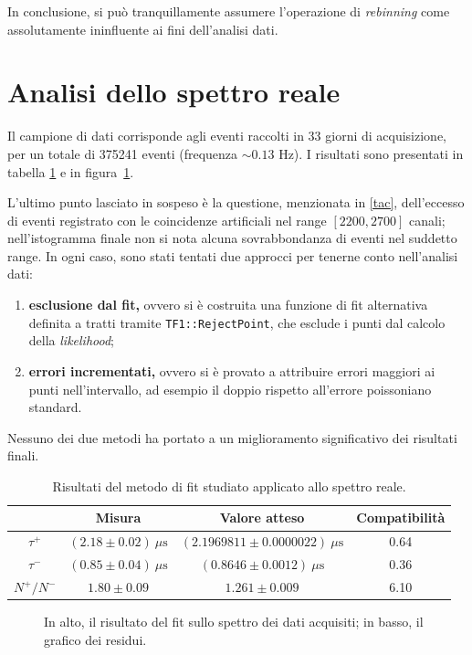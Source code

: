 \documentclass[10pt, oneside, a4paper]{article}   	%
\begin{document}
In conclusione, si può tranquillamente assumere l'operazione di \textit{rebinning} come assolutamente ininfluente ai fini dell'analisi dati.
%
\section{Analisi dello spettro reale} \label{analisireale}
Il campione di dati corrisponde agli eventi raccolti in 33 giorni di acquisizione, per un totale di 375241 eventi (frequenza $\sim0.13$ Hz). I risultati sono presentati in tabella \ref{risultatiFinali} e in figura~\ref{fig:finale}.

L'ultimo punto lasciato in sospeso è la questione, menzionata in \cref{tac}, dell'eccesso di eventi registrato con le coincidenze artificiali nel range $[2200,2700]$ canali; nell'istogramma finale non si nota alcuna sovrabbondanza di eventi nel suddetto range. In ogni caso, sono stati tentati due approcci per tenerne conto nell'analisi dati:
\begin{enumerate}
  \item \textbf{esclusione dal fit,} ovvero si è costruita una funzione di fit alternativa definita a tratti tramite \lstinline{TF1::RejectPoint}, che esclude i punti dal calcolo della \textit{likelihood};
  \item \textbf{errori incrementati,} ovvero si è provato a attribuire errori maggiori ai punti nell'intervallo, ad esempio il doppio rispetto all'errore poissoniano standard.
\end{enumerate}
Nessuno dei due metodi ha portato a un miglioramento significativo dei risultati finali.
%
\begin{table}[H]
	\centering
	\begin{tabular}{cccc}
		\toprule
				& Misura	& Valore atteso 	& Compatibilità \\	
		\midrule
		$\tau^+$	& $(2.18 \pm 0.02) \ \mu \mbox{s}$ 	& $(2.1969811 \pm 0.0000022) \  \mu \mbox{s}$ 	& 0.64 	\\
		$\tau^-$	& $(0.85 \pm 0.04)  \ \mu \mbox{s}$ 	& $(0.8646 \pm 0.0012)  \ \mu \mbox{s}$ 		& 0.36	\\
		$N^+/N^-$	& $1.80 \pm 0.09$ 	& $1.261 \pm 0.009$ 		& 6.10	\\
		\bottomrule
	\end{tabular}
	\caption{Risultati del metodo di fit studiato applicato allo spettro reale.}
	\label{risultatiFinali}
\end{table}
%
\begin{figure}[H]
 \centerline{%
  }
  \caption{In alto, il risultato del fit sullo spettro dei dati acquisiti; in basso, il grafico dei residui.}
  \label{fig:finale}
\end{figure}
%
\end{document}
